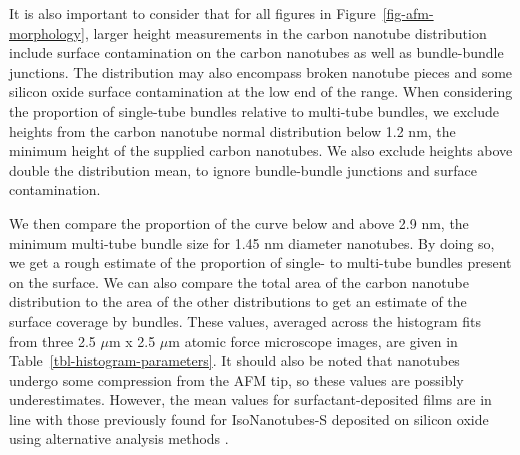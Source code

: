 \documentclass[
  a4paper,
]{scrbook}
\begin{document}
It is also important to consider that for all figures in
Figure~\ref{fig-afm-morphology}, larger height measurements in the
carbon nanotube distribution include surface contamination on the carbon
nanotubes as well as bundle-bundle junctions. The distribution may also
encompass broken nanotube pieces and some silicon oxide surface
contamination at the low end of the range. When considering the
proportion of single-tube bundles relative to multi-tube bundles, we
exclude heights from the carbon nanotube normal distribution below 1.2
nm, the minimum height of the supplied carbon nanotubes. We also exclude
heights above double the distribution mean, to ignore bundle-bundle
junctions and surface contamination.

We then compare the proportion of the curve below and above 2.9 nm, the
minimum multi-tube bundle size for 1.45 nm diameter nanotubes. By doing
so, we get a rough estimate of the proportion of single- to multi-tube
bundles present on the surface. We can also compare the total area of
the carbon nanotube distribution to the area of the other distributions
to get an estimate of the surface coverage by bundles. These values,
averaged across the histogram fits from three 2.5 \(\mu\)m x 2.5
\(\mu\)m atomic force microscope images, are given in
Table~\ref{tbl-histogram-parameters}. It should also be noted that
nanotubes undergo some compression from the AFM tip, so these values are
possibly underestimates. However, the mean values for
surfactant-deposited films are in line with those previously found for
IsoNanotubes-S deposited on silicon oxide using alternative analysis
methods \autocite{Vobornik2023}.
\end{document}

